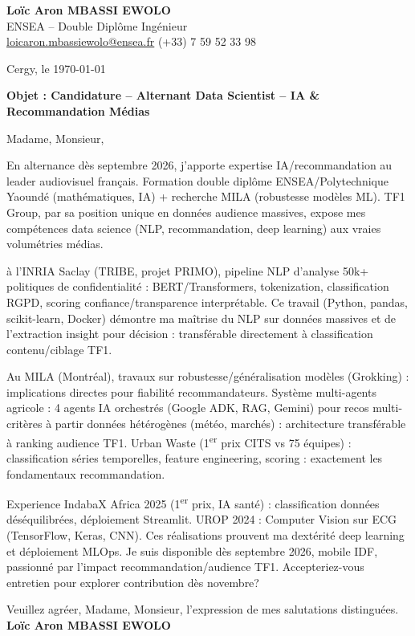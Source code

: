 \documentclass[a4paper,11pt]{article}
\begin{document}
\noindent \textbf{Lo\"ic Aron MBASSI EWOLO} \\
ENSEA -- Double Dipl\^ome Ing\'enieur \\
\href{mailto:loicaron.mbassiewolo@ensea.fr}{loicaron.mbassiewolo@ensea.fr} \quad (+33) 7 59 52 33 98

\vspace{1em}
\noindent Cergy, le \today

\vspace{1em}
\noindent \textbf{Objet : Candidature -- Alternant Data Scientist -- IA \& Recommandation M\'edias}

\vspace{1.5em}
\noindent Madame, Monsieur,

\vspace{0.8em}
\noindent En alternance d\`es septembre 2026, j'apporte expertise IA/recommandation au leader audiovisuel fran\c{c}ais. Formation double dipl\^ome ENSEA/Polytechnique Yaound\'e (math\'ematiques, IA) + recherche MILA (robustesse mod\`eles ML). TF1 Group, par sa position unique en donn\'ees audience massives, expose mes comp\'etences data science (NLP, recommandation, deep learning) aux vraies volumétries m\'edias.

\vspace{0.8em}
\noindent \`a l'INRIA Saclay (TRIBE, projet PRIMO), pipeline NLP d'analyse 50k+ politiques de confidentialit\'e : BERT/Transformers, tokenization, classification RGPD, scoring confiance/transparence interpr\'etable. Ce travail (Python, pandas, scikit-learn, Docker) d\'emontre ma ma\^itrise du NLP sur donn\'ees massives et de l'extraction insight pour d\'ecision : transf\'erable directement \`a classification contenu/ciblage TF1.

\vspace{0.8em}
\noindent Au MILA (Montréal), travaux sur robustesse/g\'en\'eralisation mod\`eles (Grokking) : implications directes pour fiabilit\'e recommandateurs. Syst\`eme multi-agents agricole : 4 agents IA orchestr\'es (Google ADK, RAG, Gemini) pour recos multi-crit\`eres \`a partir donn\'ees h\'et\'erog\`enes (m\'et\'eo, marchés) : architecture transf\'erable \`a ranking audience TF1. Urban Waste (1\textsuperscript{er} prix CITS vs 75 \'equipes) : classification s\'eries temporelles, feature engineering, scoring : exactement les fondamentaux recommandation.

\vspace{0.8em}
\noindent Experience IndabaX Africa 2025 (1\textsuperscript{er} prix, IA sant\'e) : classification donn\'ees d\'es\'equilibr\'ees, d\'eploiement Streamlit. UROP 2024 : Computer Vision sur ECG (TensorFlow, Keras, CNN). Ces r\'ealisations prouvent ma dext\'erit\'e deep learning et d\'eploiement MLOps. Je suis disponible d\`es septembre 2026, mobile IDF, passionn\'e par l'impact recommandation/audience TF1. Accepteriez-vous entretien pour explorer contribution d\`es novembre?

\vspace{1.5em}
\noindent Veuillez agr\'eer, Madame, Monsieur, l'expression de mes salutations distingu\'ees.
\vspace{2em}
\noindent \textbf{Lo\"ic Aron MBASSI EWOLO}
\end{document}
